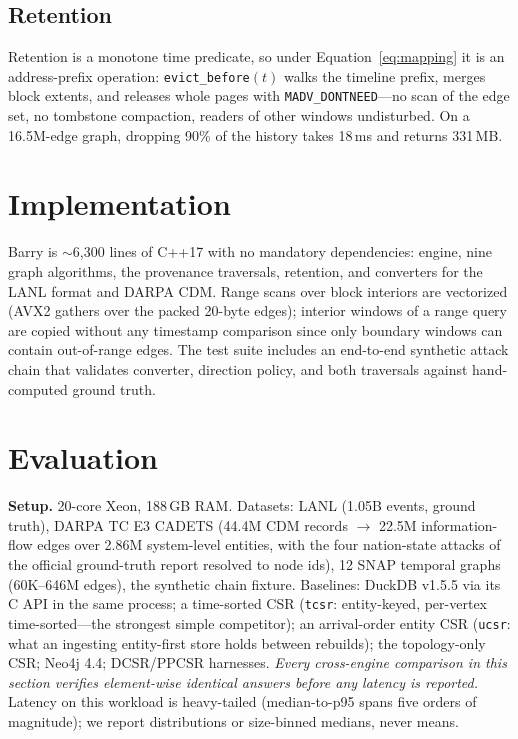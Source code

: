 \documentclass[11pt,letterpaper,twocolumn]{article}
\begin{document}
\subsection{Retention}
Retention is a monotone time predicate, so under
Equation~\eqref{eq:mapping} it is an address-prefix operation:
\texttt{evict\_before}$(t)$ walks the timeline prefix, merges block
extents, and releases whole pages with \texttt{MADV\_DONTNEED}---no
scan of the edge set, no tombstone compaction, readers of other
windows undisturbed. On a 16.5M-edge graph, dropping 90\% of the
history takes 18\,ms and returns 331\,MB.

\section{Implementation}
\label{sec:impl}
Barry is $\sim$6{,}300 lines of C++17 with no mandatory dependencies:
engine, nine graph algorithms, the provenance traversals, retention,
and converters for the LANL format and DARPA CDM. Range scans over
block interiors are vectorized (AVX2 gathers over the packed 20-byte
edges); interior windows of a range query are copied without any
timestamp comparison since only boundary windows can contain
out-of-range edges. The test suite includes an end-to-end synthetic
attack chain that validates converter, direction policy, and both
traversals against hand-computed ground truth.

\section{Evaluation}
\label{sec:eval}

\textbf{Setup.} 20-core Xeon, 188\,GB RAM. Datasets: LANL (1.05B
events, ground truth), DARPA TC E3 CADETS (44.4M CDM records $\to$
22.5M information-flow edges over 2.86M system-level entities, with
the four nation-state attacks of the official ground-truth report
resolved to node ids), 12 SNAP temporal graphs (60K--646M edges), the
synthetic chain fixture. Baselines: DuckDB v1.5.5 via its C API in
the same process; a time-sorted CSR (\texttt{tcsr}: entity-keyed,
per-vertex time-sorted---the strongest simple competitor); an
arrival-order entity CSR (\texttt{ucsr}: what an ingesting
entity-first store holds between rebuilds); the topology-only CSR;
Neo4j 4.4; DCSR/PPCSR harnesses. \emph{Every cross-engine comparison
in this section verifies element-wise identical answers before any
latency is reported.} Latency on this workload is heavy-tailed
(median-to-p95 spans five orders of magnitude); we report
distributions or size-binned medians, never means.
\end{document}

